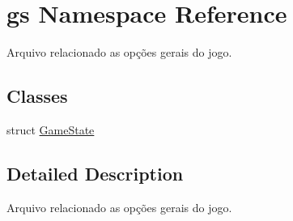 \hypertarget{namespacegs}{}\section{gs Namespace Reference}
\label{namespacegs}


Arquivo relacionado as opções gerais do jogo.  


\subsection*{Classes}
\begin{DoxyCompactItemize}
\item 
struct \hyperlink{structgs_1_1GameState}{Game\+State}
\end{DoxyCompactItemize}


\subsection{Detailed Description}
Arquivo relacionado as opções gerais do jogo. 